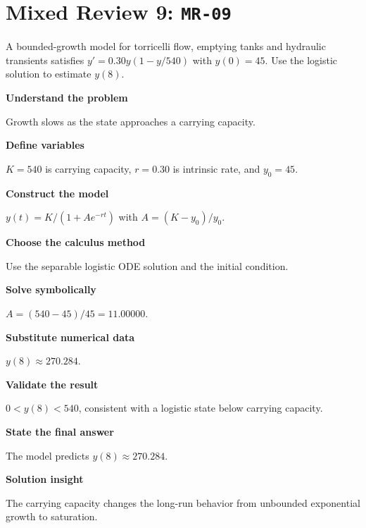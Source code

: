 \documentclass[11pt]{book}
\newcommand{\pid}[1]{\texttt{#1}}
\begin{document}
\section*{Mixed Review 9: \pid{MR-09}}
\begin{problembox}A bounded-growth model for torricelli flow, emptying tanks and hydraulic transients satisfies $y'=0.30y(1-y/540)$ with $y(0)=45$. Use the logistic solution to estimate $y(8)$.\end{problembox}
\begin{solutionbox}
\textbf{Understand the problem}\par Growth slows as the state approaches a carrying capacity.\par\medskip
\textbf{Define variables}\par $K=540$ is carrying capacity, $r=0.30$ is intrinsic rate, and $y_0=45$.\par\medskip
\textbf{Construct the model}\par $y(t)=K/(1+A e^{-rt})$ with $A=(K-y_0)/y_0$.\par\medskip
\textbf{Choose the calculus method}\par Use the separable logistic ODE solution and the initial condition.\par\medskip
\textbf{Solve symbolically}\par $A=(540-45)/45=11.00000$.\par\medskip
\textbf{Substitute numerical data}\par $y(8)\approx 270.284$.\par\medskip
\textbf{Validate the result}\par $0<y(8)<540$, consistent with a logistic state below carrying capacity.\par\medskip
\textbf{State the final answer}\par The model predicts $y(8)\approx 270.284$.\par\medskip
\textbf{Solution insight}\par The carrying capacity changes the long-run behavior from unbounded exponential growth to saturation.\par\medskip
\end{solutionbox}
\end{document}
